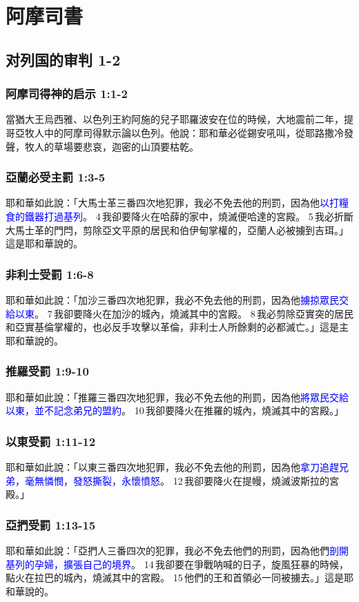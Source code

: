 \chapter{阿摩司書}

\section{对列国的审判 1-2}
\subsection{阿摩司得神的启示 1:1-2}  
當猶大王烏西雅、以色列王約阿施的兒子耶羅波安在位的時候，大地震前二年，提哥亞牧人中的阿摩司得默示論以色列。他說：耶和華必從錫安吼叫，從耶路撒冷發聲，牧人的草場要悲哀，迦密的山頂要枯乾。

\subsection{亞蘭必受主罰 1:3-5} 
耶和華如此說：「大馬士革三番四次地犯罪，我必不免去他的刑罰，因為他\textcolor{blue}{以打糧食的鐵器打過基列}。 4 我卻要降火在哈薛的家中，燒滅便哈達的宮殿。 5 我必折斷大馬士革的門閂，剪除亞文平原的居民和伯伊甸掌權的，亞蘭人必被擄到吉珥。」這是耶和華說的。


\subsection{非利士受罰 1:6-8} 
耶和華如此說：「加沙三番四次地犯罪，我必不免去他的刑罰，因為他\textcolor{blue}{擄掠眾民交給以東}。 7 我卻要降火在加沙的城內，燒滅其中的宮殿。 8 我必剪除亞實突的居民和亞實基倫掌權的，也必反手攻擊以革倫，非利士人所餘剩的必都滅亡。」這是主耶和華說的。

\subsection{推羅受罰 1:9-10}
耶和華如此說：「推羅三番四次地犯罪，我必不免去他的刑罰，因為他\textcolor{blue}{將眾民交給以東，並不記念弟兄的盟約}。 10 我卻要降火在推羅的城內，燒滅其中的宮殿。」

\subsection{以東受罰 1:11-12}
耶和華如此說：「以東三番四次地犯罪，我必不免去他的刑罰，因為他\textcolor{blue}{拿刀追趕兄弟，毫無憐憫，發怒撕裂，永懷憤怒}。 12 我卻要降火在提幔，燒滅波斯拉的宮殿。」


\subsection{亞捫受罰 1:13-15}
耶和華如此說：「亞捫人三番四次的犯罪，我必不免去他們的刑罰，因為他們\textcolor{blue}{剖開基列的孕婦，擴張自己的境界}。 14 我卻要在爭戰呐喊的日子，旋風狂暴的時候，點火在拉巴的城內，燒滅其中的宮殿。 15 他們的王和首領必一同被擄去。」這是耶和華說的。

